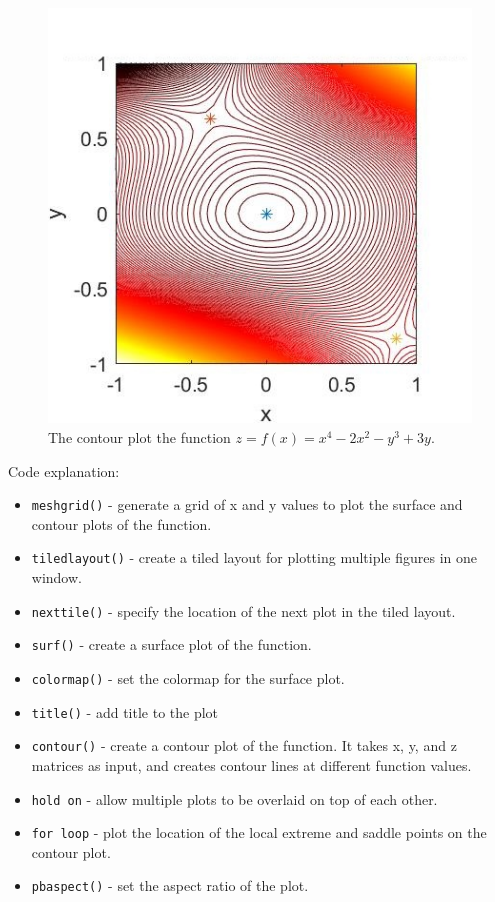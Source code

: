 \begin{figure}[H]
  \centering
  \includegraphics[width=12cm]{graphics/1b.jpg}
  \caption{The contour plot the function $ z = f(x) = x^4 - 2x^2 - y^3 + 3y $.}
\end{figure}

Code explanation: 
\begin{itemize}
  \item \texttt{\color{mygreen}meshgrid()} - generate a grid of x and y values to plot the surface and contour plots of the function.
  \item \texttt{\color{mygreen}tiledlayout()} - create a tiled layout for plotting multiple figures in one window.
  \item \texttt{\color{mygreen}nexttile()} - specify the location of the next plot in the tiled layout. 
  \item \texttt{\color{mygreen}surf()} - create a surface plot of the function.
  \item \texttt{\color{mygreen}colormap()} - set the colormap for the surface plot.
  \item \texttt{\color{mygreen}title()} - add title to the plot
  \item \texttt{\color{mygreen}contour()} - create a contour plot of the function. It takes x, y, and z matrices as input, and creates contour lines at different function values.
  \item \texttt{\color{mygreen}hold on} - allow multiple plots to be overlaid on top of each other.
  \item \texttt{\color{mygreen}for loop} - plot the location of the local extreme and saddle points on the contour plot.
  \item \texttt{\color{mygreen}pbaspect()} - set the aspect ratio of the plot.
\end{itemize}

\vspace*{2cm}